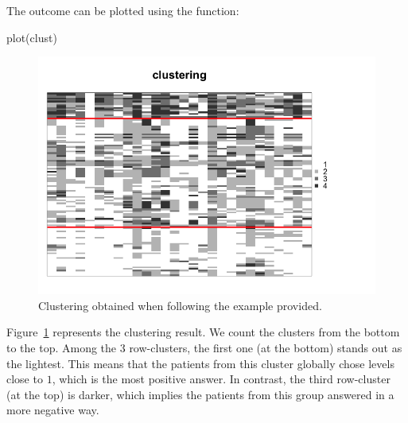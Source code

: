\noindent The outcome can be plotted using the  function:
\begin{example}
 plot(clust)
\end{example}
\begin{figure}[ht!]
\centering
  \includegraphics[width = .8\textwidth]{images/clust.png}
    \caption{Clustering obtained when following the example provided.}
    \label{fig:clust}
\end{figure}
Figure~\ref{fig:clust} represents the clustering result. We count the clusters from the bottom to the top. Among the $3$ row-clusters, the first one (at the bottom) stands out as the lightest. This means that the patients from this cluster globally chose levels close to $1$, which is the most positive answer. In contrast, the third row-cluster (at the top) is darker, which implies the patients from this group answered in a more negative way.


